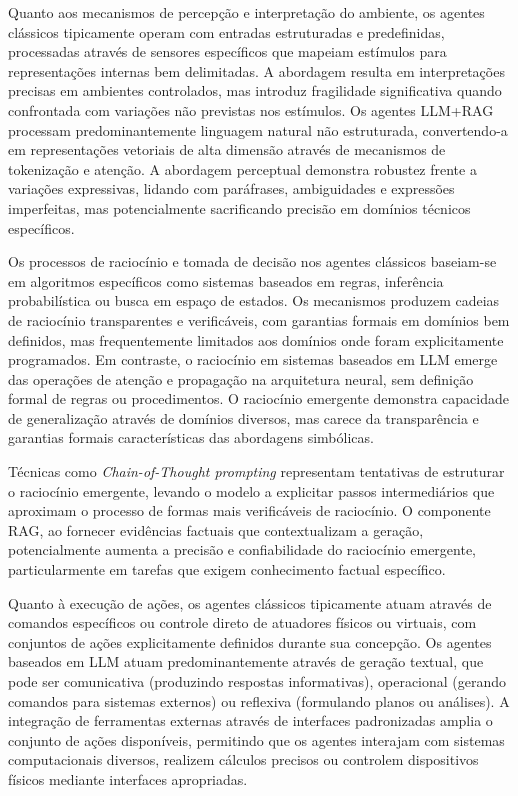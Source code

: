 \documentclass[12pt]{article}
\begin{document}
Quanto aos mecanismos de percepção e interpretação do ambiente, os agentes clássicos tipicamente operam com entradas estruturadas e predefinidas, processadas através de sensores específicos que mapeiam estímulos para representações internas bem delimitadas. A abordagem resulta em interpretações precisas em ambientes controlados, mas introduz fragilidade significativa quando confrontada com variações não previstas nos estímulos. Os agentes LLM+RAG processam predominantemente linguagem natural não estruturada, convertendo-a em representações vetoriais de alta dimensão através de mecanismos de tokenização e atenção. A abordagem perceptual demonstra robustez frente a variações expressivas, lidando com paráfrases, ambiguidades e expressões imperfeitas, mas potencialmente sacrificando precisão em domínios técnicos específicos.

Os processos de raciocínio e tomada de decisão nos agentes clássicos baseiam-se em algoritmos específicos como sistemas baseados em regras, inferência probabilística ou busca em espaço de estados. Os mecanismos produzem cadeias de raciocínio transparentes e verificáveis, com garantias formais em domínios bem definidos, mas frequentemente limitados aos domínios onde foram explicitamente programados. Em contraste, o raciocínio em sistemas baseados em LLM emerge das operações de atenção e propagação na arquitetura neural, sem definição formal de regras ou procedimentos. O raciocínio emergente demonstra capacidade de generalização através de domínios diversos, mas carece da transparência e garantias formais características das abordagens simbólicas.

Técnicas como \textit{Chain-of-Thought prompting} \citep{wei2022chain} representam tentativas de estruturar o raciocínio emergente, levando o modelo a explicitar passos intermediários que aproximam o processo de formas mais verificáveis de raciocínio. O componente RAG, ao fornecer evidências factuais que contextualizam a geração, potencialmente aumenta a precisão e confiabilidade do raciocínio emergente, particularmente em tarefas que exigem conhecimento factual específico.

Quanto à execução de ações, os agentes clássicos tipicamente atuam através de comandos específicos ou controle direto de atuadores físicos ou virtuais, com conjuntos de ações explicitamente definidos durante sua concepção. Os agentes baseados em LLM atuam predominantemente através de geração textual, que pode ser comunicativa (produzindo respostas informativas), operacional (gerando comandos para sistemas externos) ou reflexiva (formulando planos ou análises). A integração de ferramentas externas através de interfaces padronizadas amplia o conjunto de ações disponíveis, permitindo que os agentes interajam com sistemas computacionais diversos, realizem cálculos precisos ou controlem dispositivos físicos mediante interfaces apropriadas.
\end{document}

